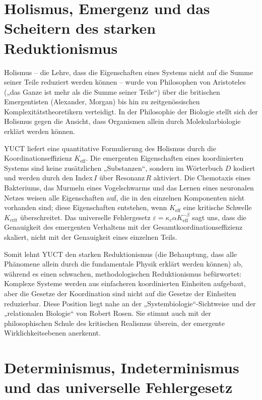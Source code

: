 \documentclass[12pt,a4paper]{article}
\begin{document}
	\section{Holismus, Emergenz und das Scheitern des starken Reduktionismus}
	
	Holismus – die Lehre, dass die Eigenschaften eines Systems nicht auf die Summe seiner Teile reduziert werden können – wurde von Philosophen von Aristoteles („das Ganze ist mehr als die Summe seiner Teile“) über die britischen Emergentisten (Alexander, Morgan) bis hin zu zeitgenössischen Komplexitätstheoretikern verteidigt. In der Philosophie der Biologie stellt sich der Holismus gegen die Ansicht, dass Organismen allein durch Molekularbiologie erklärt werden können.
	
	YUCT liefert eine quantitative Formulierung des Holismus durch die Koordinationseffizienz \(K_{\mathrm{eff}}\). Die emergenten Eigenschaften eines koordinierten Systems sind keine zusätzlichen „Substanzen“, sondern im Wörterbuch \(D\) kodiert und werden durch den Index \(I\) über Resonanz \(R\) aktiviert. Die Chemotaxis eines Bakteriums, das Murmeln eines Vogelschwarms und das Lernen eines neuronalen Netzes weisen alle Eigenschaften auf, die in den einzelnen Komponenten nicht vorhanden sind; diese Eigenschaften entstehen, wenn \(K_{\mathrm{eff}}\) eine kritische Schwelle \(K_{\mathrm{crit}}\) überschreitet. Das universelle Fehlergesetz \(\varepsilon = \kappa_c \alpha K_{\mathrm{eff}}^{-\beta}\) sagt uns, dass die Genauigkeit des emergenten Verhaltens mit der Gesamtkoordinationseffizienz skaliert, nicht mit der Genauigkeit eines einzelnen Teils.
	
	Somit lehnt YUCT den starken Reduktionismus (die Behauptung, dass alle Phänomene allein durch die fundamentale Physik erklärt werden können) ab, während es einen schwachen, methodologischen Reduktionismus befürwortet: Komplexe Systeme werden aus einfacheren koordinierten Einheiten aufgebaut, aber die Gesetze der Koordination sind nicht auf die Gesetze der Einheiten reduzierbar. Diese Position liegt nahe an der „Systembiologie“-Sichtweise und der „relationalen Biologie“ von Robert Rosen. Sie stimmt auch mit der philosophischen Schule des kritischen Realismus überein, der emergente Wirklichkeitsebenen anerkennt.
	
	\section{Determinismus, Indeterminismus und das universelle Fehlergesetz}
	
\end{document}
